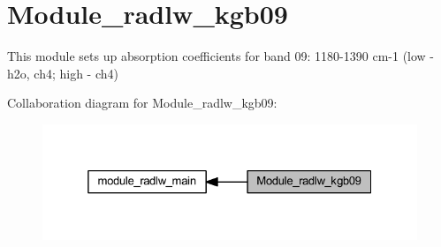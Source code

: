 \hypertarget{group__module__radlw__kgb09}{}\section{Module\+\_\+radlw\+\_\+kgb09}
\label{group__module__radlw__kgb09}


This module sets up absorption coefficients for band 09\+: 1180-\/1390 cm-\/1 (low -\/ h2o, ch4; high -\/ ch4)  


Collaboration diagram for Module\+\_\+radlw\+\_\+kgb09\+:\nopagebreak
\begin{figure}[H]
\begin{center}
\leavevmode
\includegraphics[width=325pt]{group__module__radlw__kgb09}
\end{center}
\end{figure}
